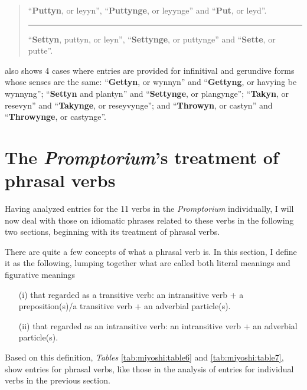 \documentclass[output=paper,colorlinks,citecolor=brown,arabicfont,chinesefont]{langscibook}
\begin{document}
\begin{quote}
    “\textbf{Puttyn}, or leyyn”, “\textbf{Puttynge}, or leyynge” and “\textbf{Put}, or leyd”.

    \rule{5cm}{.5pt}

    “\textbf{Settyn}, puttyn, or leyn”, “\textbf{Settynge}, or puttynge” and “\textbf{Sette}, or putte”.
\end{quote}

 also shows 4 cases where entries are provided for infinitival and gerundive forms whose senses are the same: “\textbf{Gettyn}, or wynnyn” and “\textbf{Gettyng}, or havying be wynnyng”; “\textbf{Settyn} and plantyn” and “\textbf{Settynge}, or plangynge”; “\textbf{Takyn}, or resevyn” and “\textbf{Takynge}, or reseyvynge”; and “\textbf{Throwyn}, or castyn” and “\textbf{Throwynge}, or castynge”.


\section{The \textit{Promptorium}'s treatment of phrasal verbs}

Having analyzed entries for the 11 verbs in the \emph{Promptorium} individually, I will now deal with those on idiomatic phrases related to these verbs in the following two sections, beginning with its treatment of phrasal verbs.

There are quite a few concepts of what a phrasal verb is. In this section, I define it as the following, lumping together what are called both literal meanings and figurative meanings

\begin{itemize}
    \item[(i)] that regarded as a transitive verb: an intransitive verb + a preposition(s)\slash a transitive verb + an adverbial particle(s).
    \item[(ii)] that regarded as an intransitive verb: an intransitive verb + an adverbial particle(s).
\end{itemize}

Based on this definition, \emph{Tables} \ref{tab:miyoshi:table6} and \ref{tab:miyoshi:table7}, show entries for phrasal verbs, like those in the analysis of entries for individual verbs in the previous section.
\end{document}
